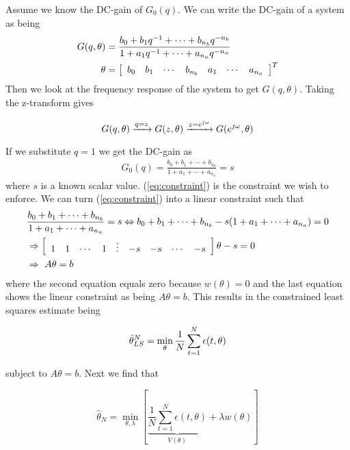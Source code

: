 \begin{example}
Assume we know the DC-gain of $G_0(q)$.
We can write the DC-gain of a system as being
\begin{align*}
G(q,\theta) &= \frac{b_0+b_1q^{-1}+\cdots+b_{n_b}q^{-n_b}}{1+a_1q^{-1}+\cdots+a_{n_a}q^{-n_a}} \\
\theta &= \left[\begin{array}{c c c c c c c} b_0 & b_1 & \cdots & b_{n_b} & a_1 & \cdots & a_{n_a} \end{array}\right]^T \\
\end{align*}
Then we look at the frequency response of the system to get $G(q,\theta)$.
Taking the z-transform gives

\begin{equation*}
G(q,\theta) \xrightarrow{q=z} G(z,\theta) \xrightarrow{z=e^{j\omega}} G(e^{j\omega},\theta)
\end{equation*}

If we substitute $q=1$ we get the DC-gain as
\begin{align}
\label{eq:constraint}
G_0(q) = \frac{b_0+b_1+\cdots+b_{n_b}}{1+a_1+\cdots+a_{n_a}} = s
\end{align}
where $s$ is a known scalar value.
(\ref{eq:constraint}) is the constraint we wish to enforce.
We can turn (\ref{eq:constraint}) into a linear constraint such that
\begin{align*}
&\frac{b_0+b_1+\cdots+b_{n_b}}{1+a_1+\cdots+a_{n_a}} = s \Leftrightarrow b_0+b_1+\cdots+b_{n_b} - s(1+a_1+\cdots+a_{n_a}) = 0 \\
&\Rightarrow \left[\begin{array}{c c c c c c c c c} 1 & 1 & \cdots & 1 & \vdots & -s & -s & \cdots & -s \end{array}\right]\theta-s=0 \\
&\Rightarrow~A\theta=b
\end{align*}
where the second equation equals zero because $w(\theta)=0$ and the last equation shows the linear constraint as being $A\theta=b$.
This results in the constrained least squares estimate being

\begin{equation*}
\hat{\theta}_{LS}^N = \min_\theta\frac{1}{N}\sum_{t=1}^N\epsilon(t,\theta)
\end{equation*}

subject to $A\theta=b$.
Next we find that

\begin{equation*}
\hat{\theta}_N = \min_{\theta,\lambda}\left[\underbrace{\frac{1}{N}\sum_{t=1}^N\epsilon(t,\theta)}_{V(\theta)} +\lambda w(\theta)\right]
\end{equation*}


\end{example}
